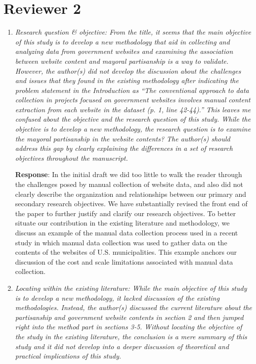 \documentclass[12pt,titlepage]{article}
\begin{document}
\section*{Reviewer 2}

\begin{enumerate}


\item \emph{  Research question & objective: From the title, it seems that the main objective of this study is to develop a new methodology that aid in collecting and analyzing data from government websites and examining the association between website content and mayoral partisanship is a way to validate. However, the author(s) did not develop the discussion about the challenges and issues that they found in the existing methodology after indicating the problem statement in the Introduction as “The conventional approach to data collection in projects focused on government websites involves manual content extraction from each website in the dataset (p. 1, line 42-44).” This leaves me confused about the objective and the research question of this study. While the objective is to develop a new methodology, the research question is to examine the mayoral partisanship in the website contents? The author(s) should address this gap by clearly explaining the differences in a set of research objectives throughout the manuscript.}
 
    \textbf{Response}:  In the initial draft we did too little to walk the reader through the challenges posed by manual collection of website data, and also did not clearly describe the organization and relationships between our primary and secondary research objectives. We have substantially revised the front end of the paper to further justify and clarify our research objectives. To better situate our contribution in the existing literature and methodology, we discuss an example of the manual data collection process used in a recent study in which manual data collection was used to gather data on the contents of the websites of U.S. municipalities. This example anchors our discussion of the cost and scale limitations associated with manual data collection.
    

\item \emph{ Locating within the existing literature: While the main objective of this study is to develop a new methodology, it lacked discussion of the existing methodologies. Instead, the author(s) discussed the current literature about the partisanship and government website contents in section 2 and then jumped right into the method part in sections 3-5. Without locating the objective of the study in the existing literature, the conclusion is a mere summary of this study and it did not develop into a deeper discussion of theoretical and practical implications of this study.}
    

\end{enumerate}
\end{document}
